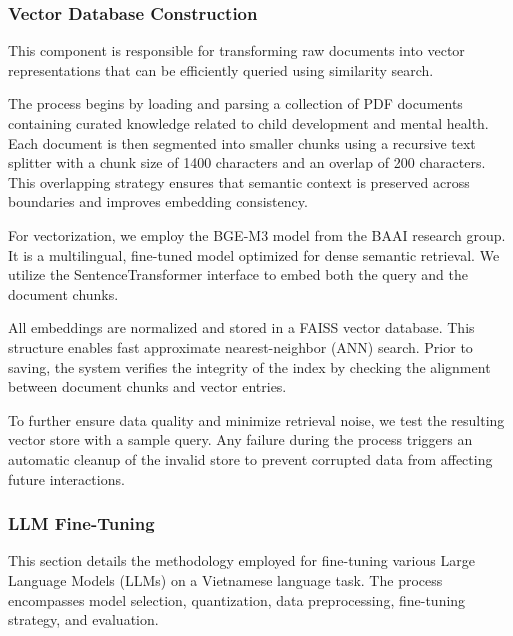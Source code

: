 \documentclass[conference]{IEEEtran}
\begin{document}
\subsubsection{Vector Database Construction}
\label{sec:Vector Database Construction}

This component is responsible for transforming raw documents into vector representations that can be efficiently queried using similarity search.


The process begins by loading and parsing a collection of PDF documents containing curated knowledge related to child development and mental health. Each document is then segmented into smaller chunks using a recursive text splitter with a chunk size of 1400 characters and an overlap of 200 characters. This overlapping strategy ensures that semantic context is preserved across boundaries and improves embedding consistency.

For vectorization, we employ the BGE-M3 model from the BAAI research group. It is a multilingual, fine-tuned model optimized for dense semantic retrieval. We utilize the SentenceTransformer interface to embed both the query and the document chunks.

All embeddings are normalized and stored in a FAISS vector database. This structure enables fast approximate nearest-neighbor (ANN) search. Prior to saving, the system verifies the integrity of the index by checking the alignment between document chunks and vector entries.

To further ensure data quality and minimize retrieval noise, we test the resulting vector store with a sample query. Any failure during the process triggers an automatic cleanup of the invalid store to prevent corrupted data from affecting future interactions.
\subsubsection{LLM Fine-Tuning}
\label{sec:LLM Fine-Tuning}

This section details the methodology employed for fine-tuning various Large Language Models (LLMs) on a Vietnamese language task. The process encompasses model selection, quantization, data preprocessing, fine-tuning strategy, and evaluation.
\end{document}
